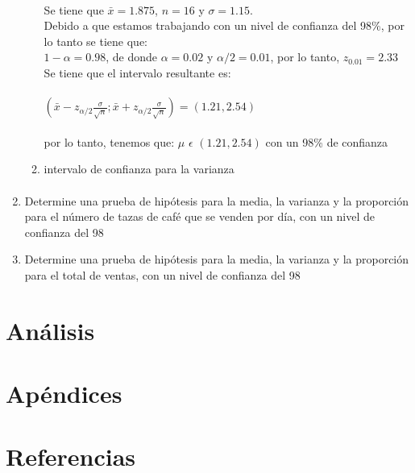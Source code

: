 \documentclass{article}
\begin{document}
\begin{enumerate}
\begin{enumerate}{}
          \paragraph{}Se tiene que $\bar{x}=1.875$, $n=16$ y $\sigma=1.15$.\\
          Debido a que estamos trabajando con un nivel de confianza del 98\%, por lo tanto se tiene que:\\ 
          $1-\alpha=0.98$, de donde $\alpha=0.02 $ y $\alpha/2=0.01$, por lo tanto, $z_{0.01}=2.33$ 
          Se tiene que el intervalo resultante es: \\\\
          $(\bar{x}-z_{\alpha/2}\frac{\sigma}{\sqrt{n}};\bar{x}+z_{\alpha/2}\frac{\sigma}{\sqrt{n}})=(1.21,2.54)$\\\\
          por lo tanto, tenemos que: $\mu$ $\epsilon$ $(1.21,2.54)$ con un 98\% de confianza
      
      \item {intervalo de confianza para la varianza}
      \paragraph{}
  \end{enumerate}

    \item Determine una prueba de hipótesis para la media, la varianza y la proporción para el número de tazas de café que se venden por día, con un nivel de confianza del 98%
    \item Determine una prueba de hipótesis para la media, la varianza y la proporción para el total de ventas, con un nivel de confianza del 98%
\end{enumerate}
\section{Análisis}
\section{Apéndices}
\section{Referencias}
\end{document}

